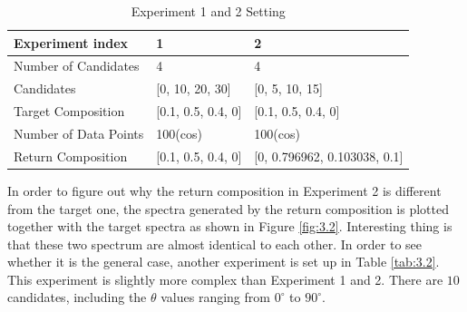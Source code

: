 \begin{table} \label{tab:3.1}
\begin{center}
\begin{tabular}{| l | l | l | }
\hline
Experiment index & 1 & 2  \\
\hline
Number of Candidates & 4 & 4  \\
\hline
Candidates & [0, 10, 20, 30] & [0, 5, 10, 15] \\
\hline
Target Composition & [0.1, 0.5, 0.4, 0] & [0.1, 0.5, 0.4, 0]     \\
\hline
Number of Data Points & 100(cos) &  100(cos)     \\
\hline
Return Composition & [0.1, 0.5, 0.4, 0] & [0, 0.796962, 0.103038, 0.1] \\
\hline
\end{tabular} 
\end{center}
\caption{Experiment 1 and 2 Setting}
\end{table}	


In order to figure out why the return composition in Experiment 2 is different from the target one, the spectra generated by the return composition is plotted together with the target spectra as shown in Figure \ref{fig:3.2}. Interesting thing is that these two spectrum are almost identical to each other. In order to see whether it is the general case, another experiment is set up in Table \ref{tab:3.2}. This experiment is slightly more complex than Experiment 1 and 2. There are $10$ candidates, including the $\theta$ values ranging from $0^{\circ}$ to $90^{\circ}$.  \\

